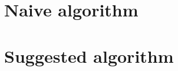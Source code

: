 \documentclass{article}
\begin{document}
    \maketitle
    \tableofcontents
    \newpage
		
    \section{Naive algorithm}
        
        \newpage

    \section{Suggested algorithm}
        
        
\end{document}
